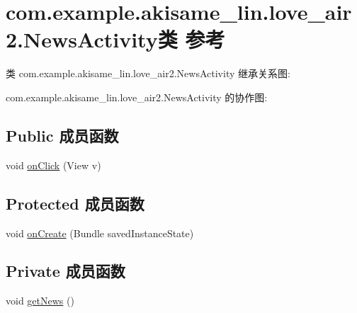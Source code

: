 \hypertarget{classcom_1_1example_1_1akisame__lin_1_1love__air2_1_1_news_activity}{}\section{com.\+example.\+akisame\+\_\+lin.\+love\+\_\+air2.\+News\+Activity类 参考}
\label{classcom_1_1example_1_1akisame__lin_1_1love__air2_1_1_news_activity}


类 com.\+example.\+akisame\+\_\+lin.\+love\+\_\+air2.\+News\+Activity 继承关系图\+:


com.\+example.\+akisame\+\_\+lin.\+love\+\_\+air2.\+News\+Activity 的协作图\+:
\subsection*{Public 成员函数}
\begin{DoxyCompactItemize}
\item 
void \mbox{\hyperlink{classcom_1_1example_1_1akisame__lin_1_1love__air2_1_1_news_activity_a2e9bc83d082026a6f005ac6523549648}{on\+Click}} (View v)
\end{DoxyCompactItemize}
\subsection*{Protected 成员函数}
\begin{DoxyCompactItemize}
\item 
void \mbox{\hyperlink{classcom_1_1example_1_1akisame__lin_1_1love__air2_1_1_news_activity_a7c5bc641cbcc658b7b75f9797e085c3d}{on\+Create}} (Bundle saved\+Instance\+State)
\end{DoxyCompactItemize}
\subsection*{Private 成员函数}
\begin{DoxyCompactItemize}
\item 
void \mbox{\hyperlink{classcom_1_1example_1_1akisame__lin_1_1love__air2_1_1_news_activity_a23d5422990cc9eafb02246cddbc083ed}{get\+News}} ()
\end{DoxyCompactItemize}
